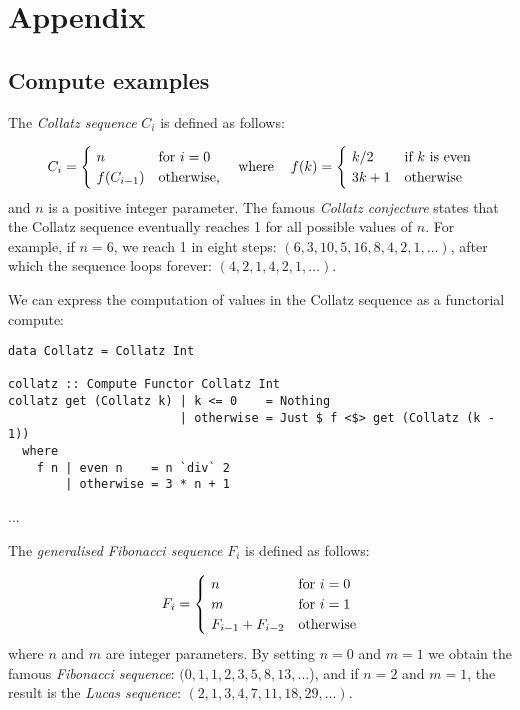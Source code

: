 \clearpage
\section{Appendix}\label{sec-appendix}

\subsection{Compute examples}

The \emph{Collatz sequence} $C_i$ is defined as follows:

\[
C_{i} = {\begin{cases}~n&{\text{for }}i=0\\~f(C_{i-1})&{\text{otherwise}},\end{cases}}\hspace{12pt}\text{where}\hspace{12pt}f(k)={\begin{cases}~k/2&{\text{if }}k\text{ is even}\\~3k+1&{\text{otherwise}}\end{cases}}
\vspace{2mm}
\]
\noindent
and $n$ is a positive integer parameter. The famous \emph{Collatz conjecture}
states that the Collatz sequence eventually reaches 1 for all possible values of
$n$. For example, if $n=6$, we reach 1 in eight steps:
$(6, 3, 10, 5, 16, 8, 4, 2, 1, \dots)$, after which the sequence loops forever:
$(4, 2, 1, 4, 2, 1, \dots)$.

We can express the computation of values in the Collatz sequence as a functorial
compute:

\begin{verbatim}
data Collatz = Collatz Int

collatz :: Compute Functor Collatz Int
collatz get (Collatz k) | k <= 0    = Nothing
                        | otherwise = Just $ f <$> get (Collatz (k - 1))
  where
    f n | even n    = n `div` 2
        | otherwise = 3 * n + 1
\end{verbatim}

...

The \emph{generalised Fibonacci sequence} $F_i$ is defined as follows:

\[
F_{i} = {\begin{cases}~n&{\text{for }}i=0\\~m&{\text{for }}i=1\\~F_{i-1}+F_{i-2}&{\text{otherwise}}\end{cases}}
\vspace{2mm}
\]
\noindent
where $n$ and $m$ are integer parameters. By setting $n=0$ and $m=1$ we obtain
the famous \emph{Fibonacci sequence}: $(0, 1, 1, 2, 3, 5, 8, 13, \dots$), and if
$n=2$ and $m=1$, the result is the \emph{Lucas sequence}:
$(2, 1, 3, 4, 7, 11, 18, 29, \dots)$.

